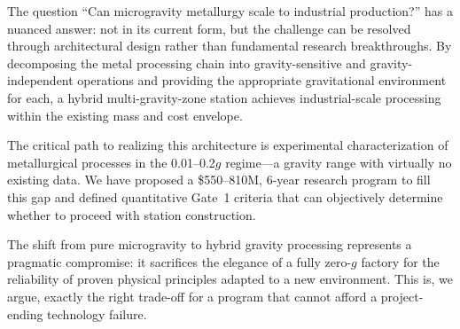 \documentclass[preprint,12pt]{elsarticle}
\begin{document}
The question ``Can microgravity metallurgy scale to industrial production?'' has a nuanced answer: not in its current form, but the challenge can be resolved through architectural design rather than fundamental research breakthroughs. By decomposing the metal processing chain into gravity-sensitive and gravity-independent operations and providing the appropriate gravitational environment for each, a hybrid multi-gravity-zone station achieves industrial-scale processing within the existing mass and cost envelope.

The critical path to realizing this architecture is experimental characterization of metallurgical processes in the 0.01--0.2$g$ regime---a gravity range with virtually no existing data. We have proposed a \$550--810M, 6-year research program to fill this gap and defined quantitative Gate~1 criteria that can objectively determine whether to proceed with station construction.

The shift from pure microgravity to hybrid gravity processing represents a pragmatic compromise: it sacrifices the elegance of a fully zero-$g$ factory for the reliability of proven physical principles adapted to a new environment. This is, we argue, exactly the right trade-off for a program that cannot afford a project-ending technology failure.

\end{document}
